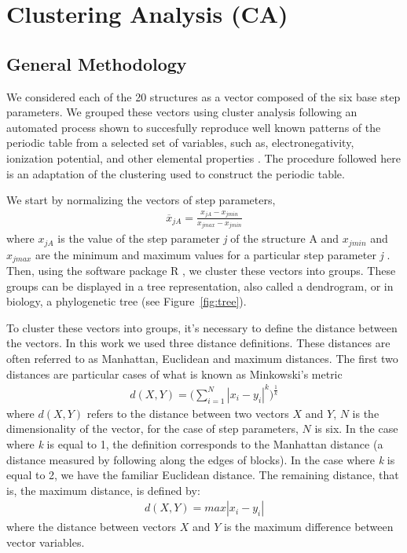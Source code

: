 \chapter{Clustering Analysis (CA)}
\label{appendix_a}


\section{General Methodology}
We considered  each of the 20  structures as a vector  composed of the
six  base step  parameters.  We  grouped these  vectors  using cluster
analysis following an automated process shown to succesfully reproduce
well  known patterns  of the  periodic table  from a  selected  set of
variables, such as, electronegativity, ionization potential, and other
elemental properties \cite{restrepo2004}.  The procedure followed here
is  an adaptation  of the  clustering used  to construct  the periodic
table.

We start by normalizing the vectors of step parameters,
\begin{gather}
\label{eq:normalization}  
\overline{x}_{jA}=\frac{x_{jA}-x_{jmin}}{x_{jmax}-x_{jmin}}
\end{gather}
where ${x}_{jA}$ is the value  of the step parameter \textit{j} of the
structure A and $x_{jmin}$ and  $x_{jmax}$ are the minimum and maximum
values for a particular step parameter \textit{j} \cite{restrepo2006}.
Then,  using  the  software  package \textsf{R}  \cite{ihaka1996},  we
cluster these vectors into groups.  These groups can be displayed in a
tree  representation,  also called  a  dendrogram,  or  in biology,  a
phylogenetic tree (see Figure~\ref{fig:tree}).

To cluster  these vectors into groups,  it's necessary  to define the
distance between  the vectors. In  this work we used  three distance
definitions.   These distances  are  often referred  to as  Manhattan,
Euclidean  and   maximum  distances.  The  first   two  distances  are
particular cases of what is known as Minkowski's metric
\begin{gather}
d(X,Y)= \Big( \sum_{i=1}^N |x_i-y_i|^k \Big)^\frac{1}{k}
\end{gather}
where $d(X,Y)$ refers to the distance between two vectors $X$ and $Y$,
$N$  is  the  dimensionality of  the  vector,  for  the case  of  step
parameters, $N$ is  six.  In the case where \textit{k}  is equal to 1,
the  definition  corresponds to  the  Manhattan  distance (a  distance
measured by  following along the edges  of blocks). In  the case where
\textit{k} is equal to 2, we have the familiar Euclidean distance. The
remaining distance, that is, the maximum distance, is defined by:
\begin{gather}
d(X,Y) = max |x_{i}-y_{i}|
\end{gather}
where  the  distance  between  vectors  $X$ and  $Y$  is  the  maximum
difference between vector variables.

